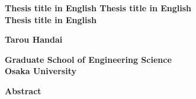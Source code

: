 \begin{center}
  \large{ \textbf{
    Thesis title in English Thesis title in English \\
    Thesis title in English
  }}
\end{center}
\begin{center}
  \large{ \textbf{
    Tarou Handai
  }}
\end{center}
\begin{center}
  \textbf{
    Graduate School of Engineering Science\\
    Osaka University
  }
\end{center}
\begin{center}
  \textbf{Abstract}
\end{center}



\lipsum[1-4]

